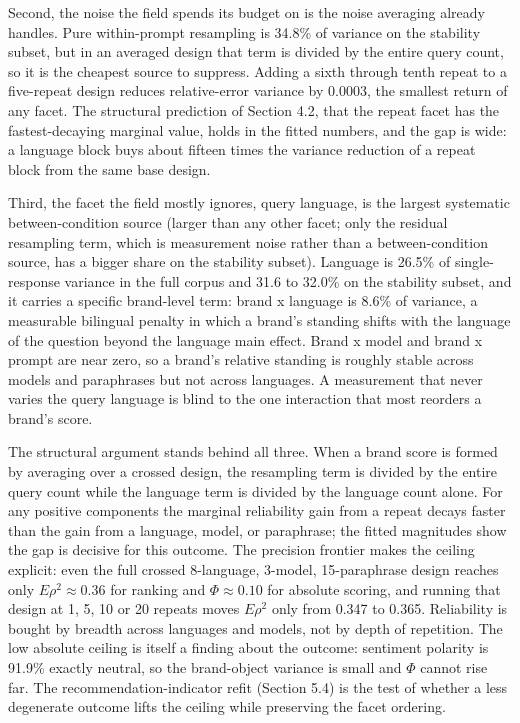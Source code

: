 \documentclass[pdflatex,sn-mathphys-num]{sn-jnl}
\begin{document}
Second, the noise the field spends its budget on is the noise averaging already handles. Pure within-prompt resampling is 34.8\% of variance on the stability subset, but in an averaged design that term is divided by the entire query count, so it is the cheapest source to suppress. Adding a sixth through tenth repeat to a five-repeat design reduces relative-error variance by 0.0003, the smallest return of any facet. The structural prediction of Section 4.2, that the repeat facet has the fastest-decaying marginal value, holds in the fitted numbers, and the gap is wide: a language block buys about fifteen times the variance reduction of a repeat block from the same base design.

Third, the facet the field mostly ignores, query language, is the largest systematic between-condition source (larger than any other facet; only the residual resampling term, which is measurement noise rather than a between-condition source, has a bigger share on the stability subset). Language is 26.5\% of single-response variance in the full corpus and 31.6 to 32.0\% on the stability subset, and it carries a specific brand-level term: brand x language is 8.6\% of variance, a measurable bilingual penalty in which a brand's standing shifts with the language of the question beyond the language main effect. Brand x model and brand x prompt are near zero, so a brand's relative standing is roughly stable across models and paraphrases but not across languages. A measurement that never varies the query language is blind to the one interaction that most reorders a brand's score.

The structural argument stands behind all three. When a brand score is formed by averaging over a crossed design, the resampling term is divided by the entire query count while the language term is divided by the language count alone. For any positive components the marginal reliability gain from a repeat decays faster than the gain from a language, model, or paraphrase; the fitted magnitudes show the gap is decisive for this outcome. The precision frontier makes the ceiling explicit: even the full crossed 8-language, 3-model, 15-paraphrase design reaches only \(E\rho^2 \approx 0.36\) for ranking and \(\Phi \approx 0.10\) for absolute scoring, and running that design at 1, 5, 10 or 20 repeats moves \(E\rho^2\) only from 0.347 to 0.365. Reliability is bought by breadth across languages and models, not by depth of repetition. The low absolute ceiling is itself a finding about the outcome: sentiment polarity is 91.9\% exactly neutral, so the brand-object variance is small and \(\Phi\) cannot rise far. The recommendation-indicator refit (Section 5.4) is the test of whether a less degenerate outcome lifts the ceiling while preserving the facet ordering.
\end{document}
